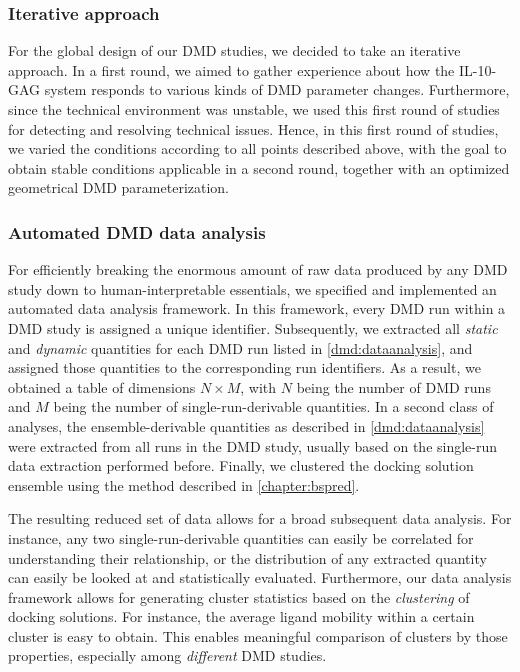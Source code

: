 \subsubsection{Iterative approach}

For the global design of our DMD studies, we decided to take an iterative
approach. In a first round, we aimed to gather experience about how the
IL-10-GAG system responds to various kinds of DMD parameter changes.
Furthermore, since the technical environment was unstable, we used this first
round of studies for detecting and resolving technical issues. Hence, in this
first round of studies, we varied the conditions according to all points
described above, with the goal to obtain stable conditions applicable in a
second round, together with an optimized geometrical DMD parameterization.


\subsubsection{Automated DMD data analysis}

For efficiently breaking the enormous amount of raw data produced by any DMD
study down to human-interpretable essentials, we specified and implemented an
automated data analysis framework. In this framework, every DMD run within a DMD
study is assigned a unique identifier. Subsequently, we extracted all
\textit{static} and \textit{dynamic} quantities for each DMD run listed in
\cref{dmd:dataanalysis}, and assigned those quantities to the corresponding
run identifiers. As a result, we obtained a table of dimensions $N \times M$,
with $N$ being the number of DMD runs and $M$ being the number of
single-run-derivable quantities. In a second class of analyses, the
ensemble-derivable quantities as described in \cref{dmd:dataanalysis} were
extracted from all runs in the DMD study, usually based on the single-run data
extraction performed before. Finally, we clustered the docking solution ensemble
using the method described in
\cref{chapter:bspred}.

The resulting reduced set of data allows for a broad subsequent data analysis.
For instance, any two single-run-derivable quantities can easily be correlated
for understanding their relationship, or the distribution of any extracted
quantity can easily be looked at and statistically evaluated. Furthermore, our
data analysis framework allows for generating cluster statistics based on the
\textit{clustering} of docking solutions. For instance, the average ligand
mobility within a certain cluster is easy to obtain. This enables meaningful
comparison of clusters by those properties, especially among \textit{different}
DMD studies.


